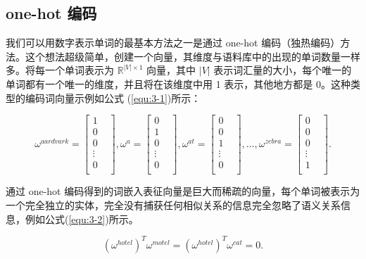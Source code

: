 \subsection{one-hot 编码}
我们可以用数字表示单词的最基本方法之一是通过 one-hot 编码（独热编码）方法。这个想法超级简单，创建一个向量，其维度与语料库中的出现的单词数量一样多。将每一个单词表示为 $\mathbb{R}^{|V|\times1}$ 向量，其中 $|V|$ 表示词汇量的大小，每个唯一的单词都有一个唯一的维度，并且将在该维度中用 1 表示，其他地方都是 0。这种类型的编码词向量示例如公式 (\ref{equ:3-1})所示：

\begin{equation}
    \omega^{aardvark} = \begin{bmatrix}1\\0\\0\\\vdots&\\0\\ \end{bmatrix}, \omega^{a} = \begin{bmatrix} 0 \\ 1 \\ 0 \\ \vdots& \\ 0 \\\end{bmatrix}, \omega ^{at} = \begin{bmatrix} 0 \\ 0 \\ 1 \\ \vdots& \\ 0 \\\end{bmatrix}, \dots, \omega ^{zebra} = \begin{bmatrix} 0 \\ 0 \\ 0 \\ \vdots& \\ 1 \\\end{bmatrix}.
\label{equ:3-1}
\end{equation}

通过 one-hot 编码得到的词嵌入表征向量是巨大而稀疏的向量，每个单词被表示为一个完全独立的实体，完全没有捕获任何相似关系的信息完全忽略了语义关系信息，例如公式(\ref{equ:3-2})所示。

\begin{equation}
    (\omega^{hotel})^{T}\omega^{motel} = (\omega^{hotel})^{T}\omega^{cat} = 0.
\label{equ:3-2}
\end{equation}

